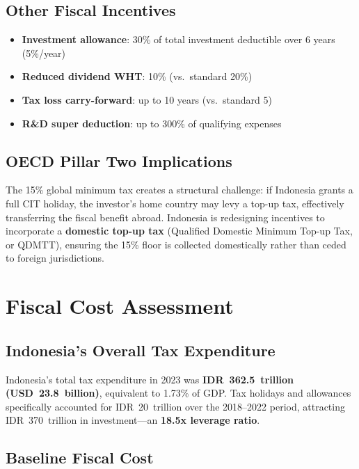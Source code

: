 \documentclass[11pt,a4paper]{article}
\begin{document}
\subsection{Other Fiscal Incentives}

\begin{itemize}[leftmargin=*]
    \item \textbf{Investment allowance}: 30\% of total investment deductible over 6 years (5\%/year)
    \item \textbf{Reduced dividend WHT}: 10\% (vs.\ standard 20\%)
    \item \textbf{Tax loss carry-forward}: up to 10 years (vs.\ standard 5)
    \item \textbf{R\&D super deduction}: up to 300\% of qualifying expenses
\end{itemize}

\subsection{OECD Pillar Two Implications}

The 15\% global minimum tax creates a structural challenge: if Indonesia grants a full CIT holiday, the investor's home country may levy a top-up tax, effectively transferring the fiscal benefit abroad. Indonesia is redesigning incentives to incorporate a \textbf{domestic top-up tax} (Qualified Domestic Minimum Top-up Tax, or QDMTT), ensuring the 15\% floor is collected domestically rather than ceded to foreign jurisdictions.

\section{Fiscal Cost Assessment}

\subsection{Indonesia's Overall Tax Expenditure}

Indonesia's total tax expenditure in 2023 was \textbf{IDR~362.5~trillion (USD~23.8~billion)}, equivalent to 1.73\% of GDP. Tax holidays and allowances specifically accounted for IDR~20~trillion over the 2018--2022 period, attracting IDR~370~trillion in investment---an \textbf{18.5x leverage ratio}.

\subsection{Baseline Fiscal Cost}
\end{document}
